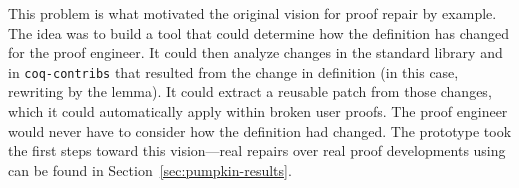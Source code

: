 This problem is what motivated the original vision for proof repair by example.
The idea was to build a tool that could determine how the definition has changed for the proof engineer.
It could then analyze changes in the standard library and in \lstinline{coq-contribs}
that resulted from the change in definition (in this case, rewriting by the lemma).
It could extract a reusable patch from those changes, which it could automatically apply within broken user proofs. %
The proof engineer would never have to consider how the definition had changed.
The \sysname prototype took the first steps toward this vision---real repairs
over real proof developments using \sysname can be found in Section~\ref{sec:pumpkin-results}.

